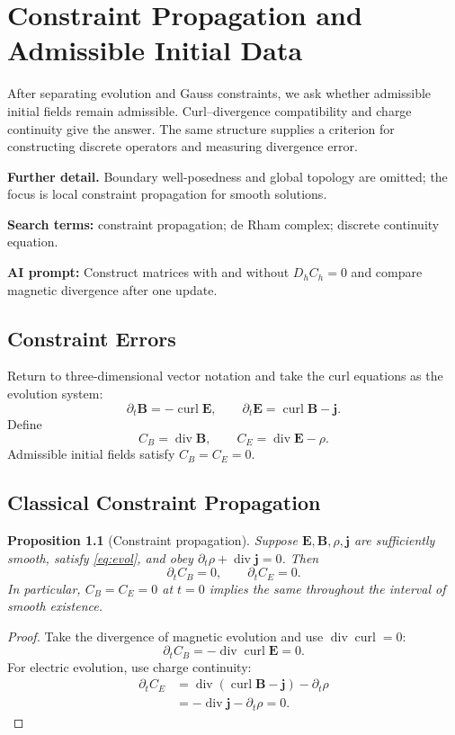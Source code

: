 \documentclass[11pt,openany]{book}
\numberwithin{equation}{chapter}
\newtheorem{proposition}[theorem]{Proposition}
\theoremstyle{definition}
\theoremstyle{remark}
\newcommand{\Div}{\operatorname{div}}
\newcommand{\curl}{\operatorname{curl}}
\newcommand{\studyroute}[3]{%
  \par\smallskip\noindent\textbf{Further detail.} #1\par
  \begingroup\raggedright\noindent\textbf{Search terms:} #2.\par\endgroup
  \noindent\textbf{AI prompt:} #3\par
}
\begin{document}
\chapter{Constraint Propagation and Admissible Initial Data}
\label{ch:constraint}
\begin{chaptersummary}
After separating evolution and Gauss constraints, we ask whether admissible initial fields remain admissible. Curl--divergence compatibility and charge continuity give the answer. The same structure supplies a criterion for constructing discrete operators and measuring divergence error.
\end{chaptersummary}
\studyroute{Boundary well-posedness and global topology are omitted; the focus is local constraint propagation for smooth solutions.}{constraint propagation; de Rham complex; discrete continuity equation}{Construct matrices with and without $D_hC_h=0$ and compare magnetic divergence after one update.}
\section{Constraint Errors}
Return to three-dimensional vector notation and take the curl equations as the evolution system:
\begin{equation}\label{eq:evol}
\partial_t\bm B=-\curl\bm E,
\qquad
\partial_t\bm E=\curl\bm B-\bm j.
\end{equation}
Define
\begin{equation}
C_B=\Div\bm B,\qquad C_E=\Div\bm E-\rho.
\end{equation}
Admissible initial fields satisfy $C_B=C_E=0$.

\section{Classical Constraint Propagation}
\begin{proposition}[Constraint propagation]\label{prop:propagate}
Suppose $\bm E,\bm B,\rho,\bm j$ are sufficiently smooth, satisfy \eqref{eq:evol}, and obey $\partial_t\rho+\Div\bm j=0$. Then
\begin{equation}
\partial_tC_B=0,\qquad \partial_tC_E=0.
\end{equation}
In particular, $C_B=C_E=0$ at $t=0$ implies the same throughout the interval of smooth existence.
\end{proposition}
\begin{proof}
Take the divergence of magnetic evolution and use $\Div\curl=0$:
\begin{equation}
\partial_t C_B=-\Div\curl\bm E=0.
\end{equation}
For electric evolution, use charge continuity:
\begin{align}
\partial_tC_E
&=\Div(\curl\bm B-\bm j)-\partial_t\rho\\
&=-\Div\bm j-\partial_t\rho=0.
\end{align}
\end{proof}
\end{document}
